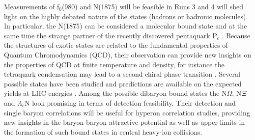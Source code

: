Measurements of f$_{0}$(980) and N(1875) will be feasible in Runs 3 and 4 will shed light on the highly debated nature of the states (hadrons or hadronic molecules). In particular, the N(1875) can be considered a molecular bound state and at the same time the strange partner of the recently discovered pentaquark P$_{c}$ \cite{He:2017PcPartner}. 
Because the structures of exotic states are related to the fundamental properties of Quantum Chromodynamics (QCD), their observation can provide new insights on the properties of QCD at finite temperature and density, for instance the tetraquark condensation may lead to a second chiral phase transition \cite{Cho:2017dcy}.
Several possible states have been studied and predictions are available on the expected yields at LHC energies \cite{Cho:2017dcy}. Among the possible dibaryon bound states the N$\Omega$, N$\Xi$ and $\Lambda_c$N look promising in terms of detection feasibility. Their detection and single baryon correlations will be useful for hyperon correlation studies,  providing new insights in the baryon-baryon attractive potential as well as upper limits in the formation of such bound states in central heavy-ion collisions.


